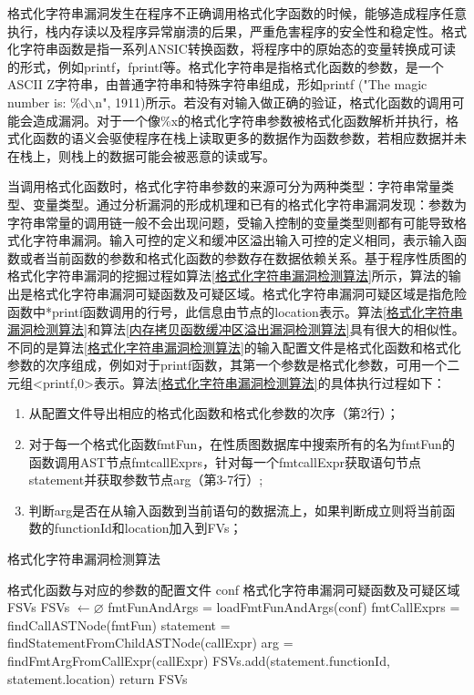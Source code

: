 {格式化字符串漏洞发生在程序不正确调用格式化字函数的时候，能够造成程序任意执行，栈内存读以及程序异常崩溃的后果，严重危害程序的安全性和稳定性。格式化字符串函数是指一系列ANSI\text{ }C转换函数，将程序中的原始态的变量转换成可读的形式，例如printf，fprintf等。格式化字符串是指格式化函数的参数，是一个ASCII Z字符串，由普通字符串和特殊字符串组成，形如printf ("The magic number is: \%d$\backslash$n", 1911)所示。若没有对输入做正确的验证，格式化函数的调用可能会造成漏洞。对于一个像\%x的格式化字符串参数被格式化函数解析并执行，格式化函数的语义会驱使程序在栈上读取更多的数据作为函数参数，若相应数据并未在栈上，则栈上的数据可能会被恶意的读或写。

当调用格式化函数时，格式化字符串参数的来源可分为两种类型：字符串常量类型、变量类型。通过分析漏洞的形成机理和已有的格式化字符串漏洞发现：参数为字符串常量的调用链一般不会出现问题，受输入控制的变量类型则都有可能导致格式化字符串漏洞。输入可控的定义和缓冲区溢出输入可控的定义相同，表示输入函数或者当前函数的参数和格式化函数的参数存在数据依赖关系。基于程序性质图的格式化字符串漏洞的挖掘过程如算法\ref{格式化字符串漏洞检测算法}所示，算法的输出是格式化字符串漏洞可疑函数及可疑区域。格式化字符串漏洞可疑区域是指危险函数中*printf函数调用的行号，此信息由节点的location表示。算法\ref{格式化字符串漏洞检测算法}和算法\ref{内存拷贝函数缓冲区溢出漏洞检测算法}具有很大的相似性。不同的是算法\ref{格式化字符串漏洞检测算法}的输入配置文件是格式化函数和格式化参数的次序组成，例如对于printf函数，其第一个参数是格式化参数，可用一个二元组<printf,0>表示。算法\ref{格式化字符串漏洞检测算法}的具体执行过程如下：
\begin{enumerate}[(1)]
\item 从配置文件导出相应的格式化函数和格式化参数的次序（第2行）；
\item 对于每一个格式化函数fmtFun，在性质图数据库中搜索所有的名为fmtFun的函数调用AST节点fmtcallExprs，针对每一个fmtcallExpr获取语句节点statement并获取参数节点arg（第3-7行）;
\item 
判断arg是否在从输入函数到当前语句的数据流上，如果判断成立则将当前函数的functionId和location加入到FVs；
\end{enumerate}

\begin{algorithm}
	\renewcommand{\algorithmicrequire}{\textbf{Input:}}
	\renewcommand{\algorithmicensure}{\textbf{Output:}}
	\caption{格式化字符串漏洞检测算法}
	\label{格式化字符串漏洞检测算法}
	\begin{algorithmic}[1]
		\REQUIRE 格式化函数与对应的参数的配置文件 conf
		\ENSURE 格式化字符串漏洞可疑函数及可疑区域 FSVs
		\STATE FSVs $\leftarrow \varnothing$
		\STATE fmtFunAndArgs = loadFmtFunAndArgs(conf)
			\STATE fmtCallExprs = findCallASTNode(fmtFun)
				\STATE statement = findStatementFromChildASTNode(callExpr)
				\STATE arg = findFmtArgFromCallExpr(callExpr)
					\STATE FSVs.add(statement.functionId, statement.location)
				\ENDIF
			\ENDFOR
		\ENDFOR	
	\STATE return FSVs	
	\end{algorithmic}
\end{algorithm}

}
